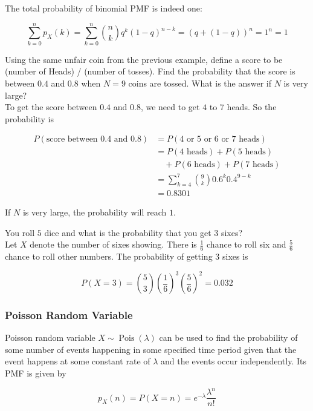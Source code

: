 \documentclass[12pt, a4paper]{article}
\newcounter{exa}
\newcommand{\Pois}{\operatorname{Pois}}
\begin{document}
The total probability of binomial PMF is indeed one:

$$\sum_{k=0}^{n} p_X(k) = \sum_{k=0}^{n} {n \choose k} q^k(1-q)^{n-k} = (q+(1-q))^n=1^n=1$$

\begin{texample}
Using the same unfair coin from the previous example, define a score to be (number of Heads) / (number of tosses). Find the probability that the score is between $0.4$ and $0.8$ when $N=9$ coins are tossed. What is the answer if $N$ is very large? \\

To get the score between $0.4$ and $0.8$, we need to get $4$ to $7$ heads. So the probability is

\begin{align*}
P(\text{score between 0.4 and 0.8})&=P(\text{4 or 5 or 6 or 7 heads}) \\
&= P(\text{4 heads})+P(\text{5 heads}) \\
&\quad + P(\text{6 heads})+P(\text{7 heads}) \\
&= \sum_{k=4}^7 \binom{9}{k}0.6^k0.4^{9-k} \\
&= 0.8301
\end{align*}

If $N$ is very large, the probability will reach $1$.
\end{texample}

\begin{texample}
You roll $5$ dice and what is the probability that you get $3$ sixes? \\

Let $X$ denote the number of sixes showing. There is $\frac16$ chance to roll six and $\frac56$ chance to roll other numbers. The probability of getting $3$ sixes is

$$P(X=3)={5\choose3}\left(\frac16\right)^3\left(\frac56\right)^2=0.032$$
\end{texample}

\subsubsection{Poisson Random Variable}

Poisson random variable $X\sim\Pois(\lambda)$ can be used to find the probability of some number of events happening in some specified time period given that the event happens at some constant rate of $\lambda$ and the events occur independently. Its PMF is given by

$$p_X(n)=P(X=n)=e^{-\lambda}\frac{\lambda^n}{n!}$$
\end{document}
